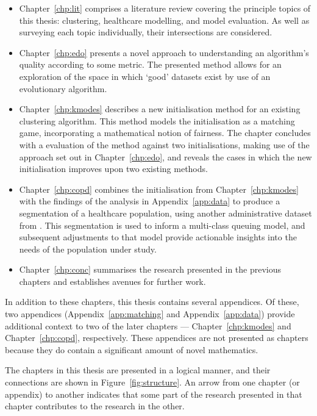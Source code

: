 \begin{itemize}
    \item Chapter~\ref{chp:lit} comprises a literature review covering the
        principle topics of this thesis: clustering, healthcare modelling, and
        model evaluation. As well as surveying each topic individually, their
        intersections are considered.
    \item Chapter~\ref{chp:edo} presents a novel approach to understanding an
        algorithm's quality according to some metric. The presented method
        allows for an exploration of the space in which `good' datasets exist
        by use of an evolutionary algorithm.
    \item Chapter~\ref{chp:kmodes} describes a new initialisation method for an
        existing clustering algorithm. This method models the initialisation as
        a matching game, incorporating a mathematical notion of fairness. The
        chapter concludes with a evaluation of the method against two
        initialisations, making use of the approach set out in
        Chapter~\ref{chp:edo}, and reveals the cases in which the new
        initialisation improves upon two existing methods.
    \item Chapter~\ref{chp:copd} combines the initialisation from
        Chapter~\ref{chp:kmodes} with the findings of the analysis in
        Appendix~\ref{app:data} to produce a segmentation of a healthcare
        population, using another administrative dataset from \ctmuhb. This
        segmentation is used to inform a multi-class queuing model, and
        subsequent adjustments to that model provide actionable insights into
        the needs of the population under study.
    \item Chapter~\ref{chp:conc} summarises the research presented in the
        previous chapters and establishes avenues for further work.
\end{itemize}

In addition to these chapters, this thesis contains several appendices. Of
these, two appendices (Appendix~\ref{app:matching} and Appendix~\ref{app:data})
provide additional context to two of the later chapters ---
Chapter~\ref{chp:kmodes} and Chapter~\ref{chp:copd}, respectively. These
appendices are not presented as chapters because they do contain a significant
amount of novel mathematics.

The chapters in this thesis are presented in a logical manner, and their
connections are shown in Figure~\ref{fig:structure}. An arrow from one chapter
(or appendix) to another indicates that some part of the research presented in
that chapter contributes to the research in the other. 


